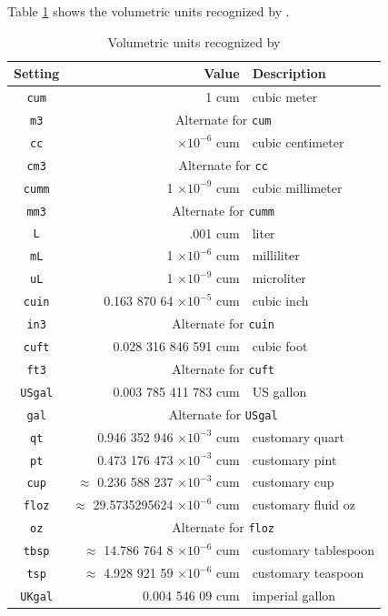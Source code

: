Table \ref{tab:volume} shows the volumetric units recognized by \PM.

\begin{table}
\centering
\caption{Volumetric units recognized by \PM}\label{tab:volume}
\begin{tabular}{crl}
\hline
Setting & Value & Description\\
\hline
\verb|cum| & 1 cum & cubic meter\\
\verb|m3| & \multicolumn{2}{c}{Alternate for \texttt{cum}}\\
\verb|cc| & $\times 10^{-6}$ cum & cubic centimeter\\
\verb|cm3| & \multicolumn{2}{c}{Alternate for \texttt{cc}}\\
\verb|cumm| & 1 $\times 10^{-9}$ cum & cubic millimeter\\
\verb|mm3| & \multicolumn{2}{c}{Alternate for \texttt{cumm}}\\
\verb|L| & .001 cum & liter\\
\verb|mL| & 1 $\times 10^{-6}$ cum & milliliter\\
\verb|uL| & 1 $\times 10^{-9}$ cum & microliter\\
\verb|cuin| & 0.163 870 64 $\times 10^{-5}$ cum & cubic inch\\
\verb|in3| & \multicolumn{2}{c}{Alternate for \texttt{cuin}}\\
\verb|cuft| & 0.028 316 846 591 cum & cubic foot\\
\verb|ft3| & \multicolumn{2}{c}{Alternate for \texttt{cuft}}\\
\verb|USgal| & 0.003 785 411 783 cum & US gallon\\
\verb|gal| & \multicolumn{2}{c}{Alternate for \texttt{USgal}}\\
\verb|qt| & 0.946 352 946 $\times 10^{-3}$ cum & customary quart\\
\verb|pt| & 0.473 176 473 $\times 10^{-3}$ cum & customary pint\\
\verb|cup| & $\approx$ 0.236 588 237 $\times 10^{-3}$ cum & customary cup\\
\verb|floz| & $\approx$ 29.5735295624 $\times 10^{-6}$ cum & customary fluid oz\\
\verb|oz| & \multicolumn{2}{c}{Alternate for \texttt{floz}}\\
\verb|tbsp| & $\approx$ 14.786 764 8 $\times 10^{-6}$ cum & customary tablespoon\\
\verb|tsp| & $\approx$ 4.928 921 59 $\times 10^{-6}$ cum & customary teaspoon\\
\verb|UKgal| & 0.004 546 09 cum & imperial gallon\\
\hline
\end{tabular}
\end{table}
